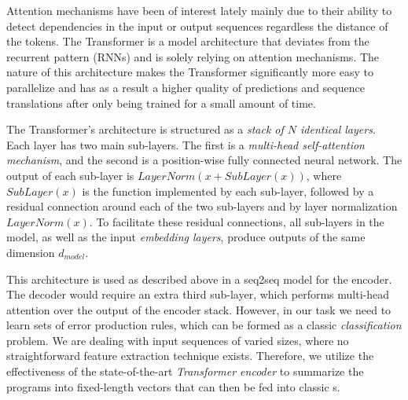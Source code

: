 Attention mechanisms have been of interest lately \citep{Bahdanau2015, Kim2017,
Vaswani_2017} mainly due to their ability to detect dependencies in the input or
output sequences regardless the distance of the tokens. The Transformer is a
model architecture that deviates from the recurrent pattern (\eg RNNs) and is
solely relying on attention mechanisms. The nature of this architecture makes
the Transformer significantly more easy to parallelize and has as a result a
higher quality of predictions and sequence translations after only being trained
for a small amount of time.

The Transformer's architecture is structured as a \emph{stack of $N$ identical
layers}. Each layer has two main sub-layers. The first is a \emph{multi-head
self-attention mechanism}, and the second is a position-wise fully connected
neural network. The output of each sub-layer is $LayerNorm(x + SubLayer(x))$,
where $SubLayer(x)$ is the function implemented by each sub-layer, followed by a
residual connection around each of the two sub-layers and  by layer
normalization $LayerNorm(x)$. To facilitate these residual connections, all
sub-layers in the model, as well as the input \emph{embedding layers}, produce
outputs of the same dimension $d_{model}$.

This architecture is used as described above in a seq2seq model
\citep{Vaswani_2017} for the encoder. The decoder would require an extra third
sub-layer, which performs multi-head attention over the output of the encoder
stack. However, in our task we need to learn sets of error production rules,
which can be formed as a classic \emph{classification} problem. We are dealing
with input sequences of varied sizes, where no straightforward feature
extraction technique exists. Therefore, we utilize the effectiveness of the
state-of-the-art \emph{Transformer encoder} to summarize the programs into
fixed-length vectors that can then be fed into classic \dnn{}s.


